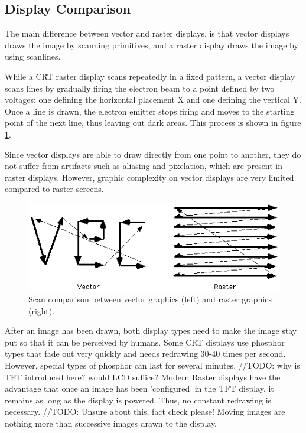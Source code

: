 \subsection{Display Comparison}
The main difference between vector and raster displays, is that vector displays draws the image by scanning primitives, and a raster display draws the image by using scanlines. 

While a CRT raster display scans repeatedly in a fixed pattern, a vector display scans lines by gradually firing the electron beam to a point defined by two voltages: one defining the horizontal placement X and one defining the vertical Y. 
Once a line is drawn, the electron emitter stops firing and moves to the starting point of the next line, thus leaving out dark areas. 
This process is shown in figure \ref{fig:vectorscan}.

Since vector displays are able to draw directly from one point to another, they do not suffer from artifacts such as aliasing and pixelation, which are present in raster displays\cite{vector-monitor}.
However, graphic complexity on vector displays are very limited compared to raster screens.

\begin{figure}[h!]
\centering \includegraphics[width=0.8\linewidth]{images/scan.png}
\caption{Scan comparison between vector graphics (left) and raster graphics (right)\cite{vecvsras}.}
\label{fig:vectorscan}
\end{figure}

After an image has been drawn, both display types need to make the image stay put so that it can be perceived by humans. 
Some CRT displays use phosphor types that fade out very quickly and needs redrawing 30-40 times per second\cite{vector-monitor}.
However, special types of phosphor can last for several minutes.
//TODO: why is TFT introduced here? would LCD suffice? Modern Raster displays have the advantage that once an image has been 'configured' in the TFT display, it remains as long as the display is powered. 
Thus, no constant redrawing is necessary. //TODO: Unsure about this, fact check please!
Moving images are nothing more than successive images drawn to the display.

